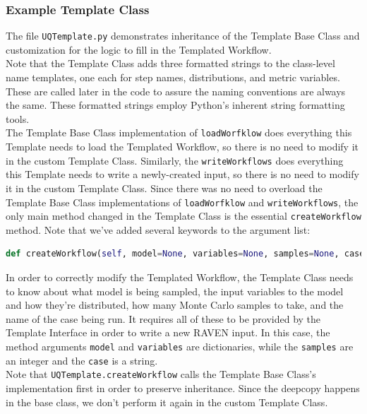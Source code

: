 \subsubsection{Example Template Class}
%
The file \texttt{UQTemplate.py} demonstrates inheritance of the Template Base Class and customization for the logic to
%
fill in the Templated Workflow.
\\

Note that the Template Class adds three formatted strings to the class-level name templates, one each for step names,
%
distributions, and metric variables. These are called later in the code to assure the naming conventions are always the
%
same. These formatted strings employ Python's inherent string formatting tools.
\\

The Template Base Class implementation of \texttt{loadWorfklow} does everything this Template needs to load the
%
Templated Workflow, so there is no need to modify it in the custom Template Class. Similarly, the \texttt{writeWorkflows}
%
does everything this Template needs to write a newly-created input, so there is no need to modify it in the custom
%
Template Class.  Since there was no need to overload the Template Base Class implementations of \texttt{loadWorfklow}
%
and \texttt{writeWorkflows}, the only main method changed in the Template Class is the essential \texttt{createWorkflow}
%
method. Note that we've added several keywords to the argument list:
%
\begin{lstlisting}[language=python]
  def createWorkflow(self, model=None, variables=None, samples=None, case=None, **kwargs):
\end{lstlisting}
%
In order to correctly modify the Templated Workflow, the Template Class needs to know about what model is being sampled,
%
the input variables to the model and how they're distributed, how many Monte Carlo samples to take, and the name of the
%
case being run. It requires all of these to be provided by the Template Interface in order to write a new RAVEN input.
%
In this case, the method arguments \texttt{model} and \texttt{variables} are dictionaries, while the \texttt{samples}
%
are an integer and the \texttt{case} is a string.
\\

Note that \texttt{UQTemplate.createWorkflow} calls the Template Base Class's implementation first in order to preserve
%
inheritance. Since the deepcopy happens in the base class, we don't perform it again in the custom Template Class.
\\

